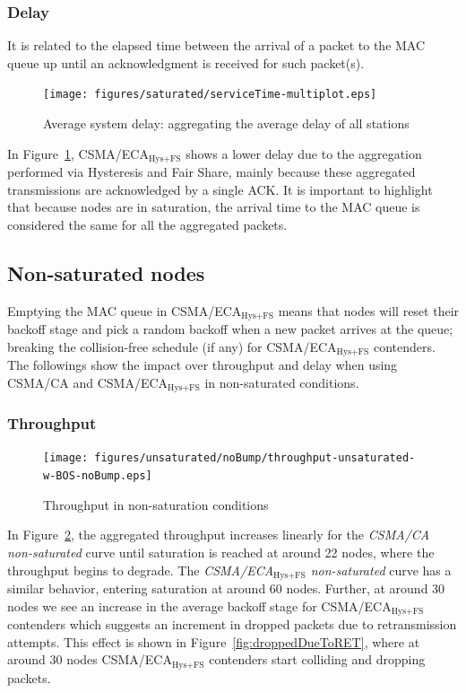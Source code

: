 \documentclass[a4paper,journal]{IEEEtran}
\begin{document}
	\subsubsection{Delay}
	
	It is related to the elapsed time between the arrival of a packet to the MAC queue up until an acknowledgment is received for such packet(s).

	\begin{figure}[tb]
		\centering
		\texttt{[image: figures/saturated/serviceTime-multiplot.eps]}
		\caption{Average system delay: aggregating the average delay of all stations}
		\label{fig:serviceTime-sat}
	\end{figure}
	
	In Figure~\ref{fig:serviceTime-sat}, CSMA/ECA$_{\text{Hys+FS}}$ shows a lower delay due to the aggregation performed via Hysteresis and Fair Share, mainly because these aggregated transmissions are acknowledged by a single ACK. It is important to highlight that because nodes are in saturation, the arrival time to the MAC queue is considered the same for all the aggregated packets.

	\subsection{Non-saturated nodes}\label{resultsUnsaturated}
	Emptying the MAC queue in CSMA/ECA$_{\text{Hys+FS}}$ means that nodes will reset their backoff stage and pick a random backoff when a new packet arrives at the queue; breaking the collision-free schedule (if any)  for CSMA/ECA$_{\text{Hys+FS}}$ contenders. The followings show the impact over throughput and delay when using CSMA/CA and CSMA/ECA$_{\text{Hys+FS}}$ in non-saturated conditions.\\
	
	\subsubsection{Throughput}
	
   	\begin{figure}[tb]
		\centering
		\texttt{[image: figures/unsaturated/noBump/throughput-unsaturated-w-BOS-noBump.eps]}
		\caption{Throughput in non-saturation conditions}
		\label{fig:throughputUnsat}
	\end{figure}
	
	In Figure~\ref{fig:throughputUnsat}, the aggregated throughput increases linearly for the \emph{CSMA/CA non-saturated} curve until saturation is reached at around 22 nodes, where the throughput begins to degrade. The \emph{CSMA/ECA$_{\text{Hys+FS}}$ non-saturated} curve has a similar behavior, entering saturation at around 60 nodes. Further, at around 30 nodes we see an increase in the average backoff stage for CSMA/ECA$_{\text{Hys+FS}}$ contenders which suggests an increment in dropped packets due to retransmission attempts. This effect is shown in Figure~\ref{fig:droppedDueToRET}, where at around 30 nodes CSMA/ECA$_{\text{Hys+FS}}$ contenders start colliding and dropping packets. 
	
\end{document}
